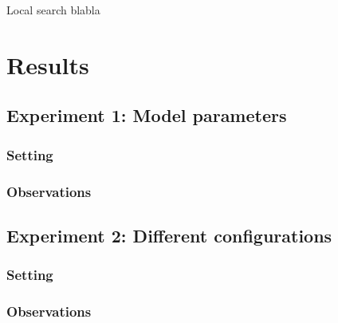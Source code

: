 \documentclass[11pt]{article}
\begin{document}
Local search blabla



\section{Results}

\subsection{Experiment 1: Model parameters}

\subsubsection{Setting} 

\subsubsection{Observations}

\subsection{Experiment 2: Different configurations}

\subsubsection{Setting}

\subsubsection{Observations}
\end{document}
